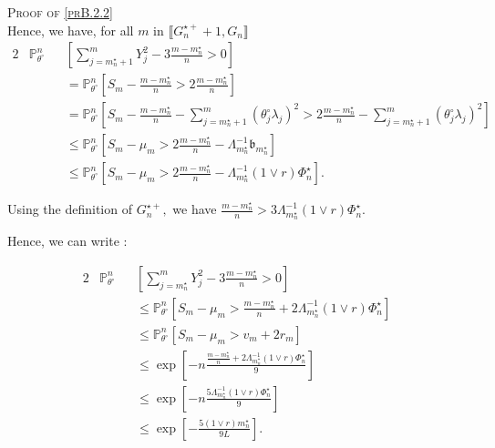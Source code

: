\begin{pro}{\textsc{Proof of \textsc{\cref{prB.2.2}}} \\}
Hence, we have, for all $m$ in $\llbracket G_{n}^{\star+} + 1, G_{n}\rrbracket$
\begin{alignat*}{2}
& \mathds{P}_{\theta^{\circ}}^{n}&&\left[\sum\limits_{j = m_{n}^{\star} + 1}^{m} Y_{j}^{2} - 3 \frac{m - m_{n}^{\star}}{n} > 0\right]\\
& && = \mathds{P}_{\theta^{\circ}}^{n}\left[S_{m} - \frac{m - m_{n}^{\star}}{n} > 2 \frac{m - m_{n}^{\star}}{n}\right]\\
& && = \mathds{P}_{\theta^{\circ}}^{n}\left[S_{m} - \frac{m - m_{n}^{\star}}{n} - \sum\limits_{j = m_{n}^{\star} + 1}^{m} \left(\theta^{\circ}_{j}\lambda_{j}\right)^{2} > 2 \frac{m - m_{n}^{\star}}{n} - \sum\limits_{j = m_{n}^{\star} + 1}^{m} \left(\theta^{\circ}_{j}\lambda_{j}\right)^{2}\right]\\
& && \leq \mathds{P}_{\theta^{\circ}}^{n}\left[S_{m} - \mu_{m} > 2 \frac{m - m_{n}^{\star}}{n} - \Lambda_{m_{n}^{\star}}^{-1} \mathfrak{b}_{m_{n}^{\star}}\right]\\
& && \leq \mathds{P}_{\theta^{\circ}}^{n}\left[S_{m} - \mu_{m} > 2 \frac{m - m_{n}^{\star}}{n} - \Lambda_{m_{n}^{\star}}^{-1} \left(1 \vee r\right) \Phi_{n}^{\star} \right].
\end{alignat*}

Using the definition of $G_{n}^{\star+},$ we have $\frac{m - m_{n}^{\star}}{n} > 3 \Lambda_{m_{n}^{\star}}^{-1}\left(1 \vee r\right) \Phi_{n}^{\star}.$

Hence, we can write :

\begin{alignat*}{2}
& \mathds{P}_{\theta^{\circ}}^{n}&&\left[\sum\limits_{j = m_{n}^{\star}}^{m} Y_{j}^{2} - 3 \frac{m - m_{n}^{\star}}{n} > 0\right]\\
& &&\leq \mathds{P}_{\theta^{\circ}}^{n}\left[S_{m} - \mu_{m} > \frac{m - m_{n}^{\star}}{n} + 2 \Lambda_{m_{n}^{\star}}^{-1} \left(1 \vee r \right) \Phi_{n}^{\star}\right]\\
& &&\leq \mathds{P}_{\theta^{\circ}}^{n}\left[S_{m} - \mu_{m} > v_{m} + 2 r_{m}\right]\\
& &&\leq \exp\left[- n\frac{\frac{m - m_{n}^{\star}}{n} + 2 \Lambda_{m_{n}^{\star}}^{-1} \left(1 \vee r\right) \Phi_{n}^{\star}}{9}\right]\\
& &&\leq \exp\left[- n \frac{5 \Lambda_{m_{n}^{\star}}^{-1} \left( 1 \vee r\right) \Phi_{n}^{\star}}{9}\right]\\
& &&\leq \exp\left[- \frac{5 \left( 1 \vee r\right) m_{n}^{\star}}{9 L}\right].
\end{alignat*}


\end{pro}
